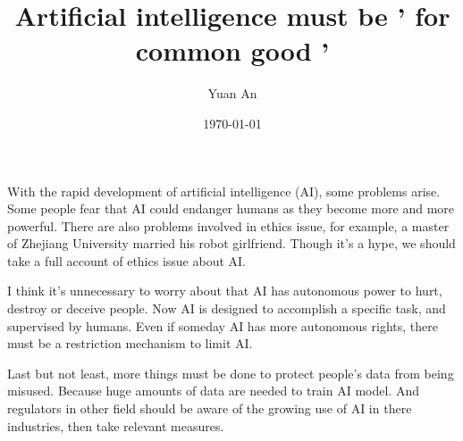 \documentclass[a4paper, 12pt]{article}
\title{Artificial intelligence must be ' for common good '}
\author{Yuan An}
\date{\today}
\begin{document}
\maketitle
With the rapid development of artificial intelligence (AI), some problems arise. Some people fear that AI could endanger humans as they become more and more powerful. There are also problems involved in ethics issue, for example, a master of Zhejiang University married his robot girlfriend. Though it's a hype, we should take a full account of ethics issue about AI.
\par
I think it's unnecessary to worry about that AI has autonomous power to hurt, destroy or deceive people. Now AI is designed to accomplish a specific task, and supervised by humans. Even if someday AI has more autonomous rights, there must be a restriction mechanism to limit AI.
\par
Last but not least, more things must be done to protect people's data from being misused. Because huge amounts of data are needed to train AI model. And regulators in other field should be aware of the growing use of AI in there industries, then take relevant measures.
\end{document}
